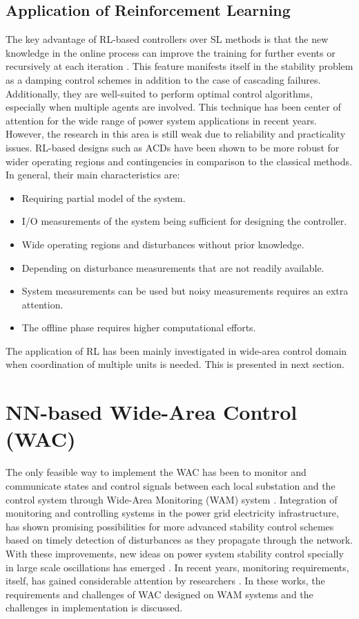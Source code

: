 \documentclass[journal]{IEEEtran}
\begin{document}
\subsection{Application of Reinforcement Learning}
The key advantage of RL-based controllers over SL methods is that the new knowledge in the online process can improve the training for further events or recursively at each iteration \cite{6070201, 6410470, 6345608}. This feature manifests itself in the stability problem as a damping control schemes in addition to the case of cascading failures. Additionally, they are well-suited to perform optimal control algorithms, especially when multiple agents are involved. This technique has been center of attention for the wide range of power system applications in recent years. However, the research in this area is still weak due to reliability and practicality issues. RL-based designs such as ACDs have been shown to be more robust for wider operating regions and contingencies in comparison to the classical methods\cite{Wide3}. In general, their main characteristics are:
\begin{itemize}
\item Requiring partial model of the system.
 \item I/O measurements of the system being sufficient for designing the controller.
\item  Wide operating regions and disturbances without prior knowledge.
\item Depending on disturbance measurements that are not readily available.
\item System measurements can be used but noisy measurements requires an extra attention.
\item The offline phase requires higher computational efforts.
\end{itemize}
The application of RL has been mainly investigated in wide-area control domain when coordination of multiple units is needed. This is presented in next section.

\vspace{-3mm}
\section{NN-based Wide-Area Control (WAC)}
The only feasible way to implement the WAC has been to monitor and communicate states and control signals between each local substation and the control system through Wide-Area Monitoring (WAM) system \cite{WideLR1}. Integration of monitoring and controlling systems in the power grid electricity infrastructure, has shown promising possibilities for more advanced stability control schemes based on timely detection of disturbances as they propagate through the network. With these improvements, new ideas on power system stability control specially in large scale oscillations has emerged \cite{1610668, 5549870}. In recent years, monitoring requirements, itself, has gained considerable attention by researchers \cite{6175664, 1564188, 5281956, 5979216}. In these works, the requirements and challenges of WAC designed on WAM systems and the challenges in implementation is discussed. 
\end{document}
